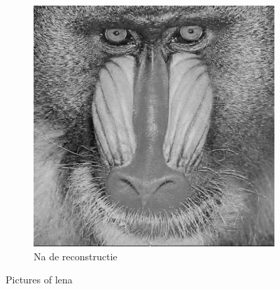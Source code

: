 \begin{figure}
\begin{subfigure}[b]{0.45\textwidth}
        \includegraphics[width=\textwidth]{../src/inpainting/baboon_fixed}
        \caption{Na de reconstructie}
        \label{fig:mouse}
    \end{subfigure}
    \caption{Pictures of lena}\label{fig:baboon}
\end{figure}


